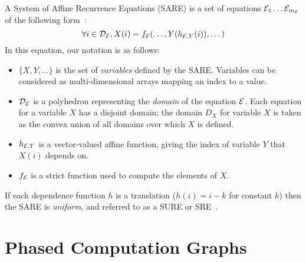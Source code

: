 A System of Affine Recurrence Equations (SARE) is a set of equations
${\cal E}_1 \dots {\cal E}_{m_{\cal E}}$ of the following form~\cite{DRV00}:
\begin{equation}
\forall i \in {\cal D_{\cal E}}, X(i) = f_{\cal E}(\dots, Y(h_{{\cal
E}, Y}(i)), \dots)
\label{eq:sare}
\end{equation}
In this equation, our notation is as follows:
\begin{itemize}

\item $\{X, Y, \dots\}$ is the set of {\it variables} defined by the
SARE.  Variables can be considered as multi-dimensional arrays mapping
an index to a value.

\item ${\cal D_{\cal E}}$ is a polyhedron representing the {\it
domain} of the equation ${\cal E}$.  Each equation for a variable $X$
has a disjoint domain; the domain $D_X$ for variable $X$ is taken as
the convex union of all domains over which $X$ is defined.

\item $h_{{\cal E}, Y}$ is a vector-valued affine function, giving the
index of variable $Y$ that $X(i)$ depends on.

\item $f_{\cal E}$ is a strict function used to compute the elements
of $X$.

\end{itemize}

If each dependence function $h$ is a translation ($h(i) = i - k$ for
constant $k$) then the SARE is {\it uniform}, and referred to as a
SURE or SRE~\cite{karp67}.

\section{Phased Computation Graphs}
\label{sec:pcg}

